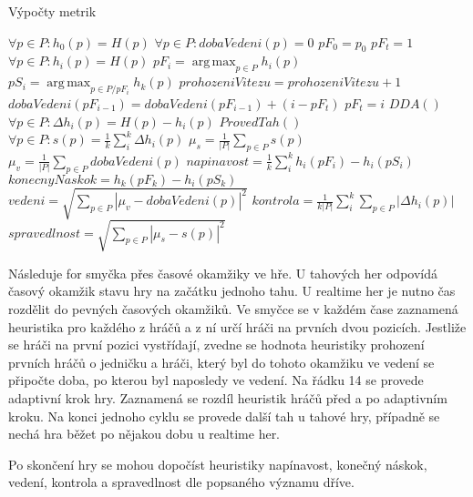 \begin{algorithm}
\caption{Výpočty metrik}
\label{alg-metrik}
\begin{algorithmic}[1]
\State $\forall p \in P : h_0(p) = H(p)$
\State $\forall p \in P : dobaVedeni(p) = 0$
\State $pF_0 = p_0$
\State $pF_t = 1$
   \State $\forall p \in P : h_i(p) = H(p)$
	 \State $pF_{i}  = \operatorname{arg\,max}_{p \in P} h_{i}(p)$
	 \State $pS_i = \operatorname{arg\,max}_{p \in P / pF_i} h_{k}(p)$
			\State $prohozeniVitezu = prohozeniVitezu + 1$
			\State $dobaVedeni(pF_{i-1}) = dobaVedeni(pF_{i-1}) + (i - pF_t)$
			\State $pF_t = i$
	 \EndIf
	 \State $DDA()$
	 \State $\forall p \in P : \Delta h_i(p) = H(p) - h_i(p)$
	 \State $ProvedTah()$
\EndFor
\State $\forall p \in P : s(p) = \frac{1}{k}\sum_i^k \Delta h_i(p)$
\State $\mu_s = \frac{1}{|P|}\sum_{p \in P} s(p)$
\State $\mu_v = \frac{1}{|P|}\sum_{p \in P} dobaVedeni(p)$
\State $napinavost = \frac{1}{k}\sum_i^k{h_i(pF_i) - h_i(pS_i)}$ 
\State $konecnyNaskok = h_k(pF_k) - h_i(pS_k)$
\State $vedeni = \sqrt{\sum_{p \in P} |\mu_v - dobaVedeni(p)|^2}$
\State $kontrola = \frac{1}{k |P|}\sum_i^k{\sum_{p \in P} |\Delta h_i(p)|}$
\State $spravedlnost = \sqrt{\sum_{p \in P} |\mu_s - s(p)|^2}$
\end{algorithmic}
\end{algorithm}

Následuje for smyčka přes časové okamžiky ve hře. U tahových her odpovídá časový okamžik stavu hry na začátku jednoho tahu. U realtime her je nutno čas rozdělit do pevných časových okamžiků. Ve smyčce se v každém čase zaznamená heuristika pro každého z hráčů a z ní určí hráči na prvních dvou pozicích. Jestliže se hráči na první pozici vystřídají, zvedne se hodnota heuristiky prohození prvních hráčů o jedničku a hráči, který byl do tohoto okamžiku ve vedení se připočte doba, po kterou byl naposledy ve vedení. Na řádku 14 se provede adaptivní krok hry. Zaznamená se rozdíl heuristik hráčů před a po adaptivním kroku. Na konci jednoho cyklu se provede další tah u tahové hry, případně se nechá hra běžet po nějakou dobu u realtime her.

Po skončení hry se mohou dopočíst heuristiky napínavost, konečný náskok, vedení, kontrola a spravedlnost dle popsaného významu dříve.


